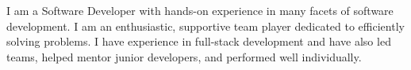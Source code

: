 
\begin{cvparagraph}
I am a Software Developer with hands-on experience in many facets of software development.  
I am an enthusiastic, supportive team player dedicated to efficiently solving problems.  
I have experience in full-stack development and have also led teams, helped mentor junior developers, and performed well
individually.
\end{cvparagraph}